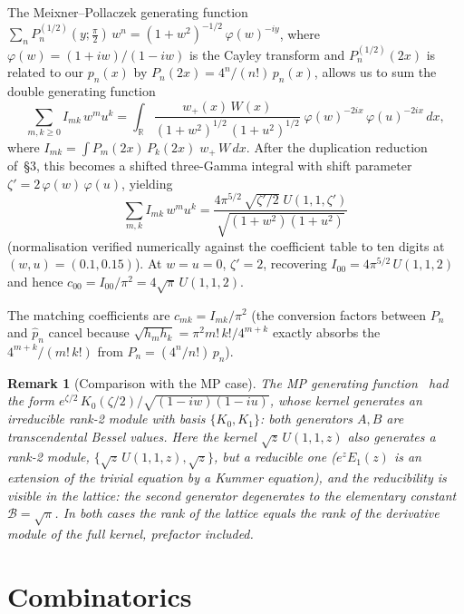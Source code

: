 \documentclass[11pt,a4paper]{article}
\newtheorem{remark}[proposition]{Remark}
\newcommand{\R}{\mathbb{R}}
\begin{document}
The Meixner--Pollaczek generating function
$\sum_n P_n^{(1/2)}(y;\tfrac\pi2)\, w^n
= (1+w^2)^{-1/2}\,\varphi(w)^{-iy}$,
where $\varphi(w) = (1+iw)/(1-iw)$ is the Cayley transform
and $P_n^{(1/2)}(2x)$ is related to our $p_n(x)$ by
$P_n(2x) = 4^n/(n!)\, p_n(x)$,
allows us to sum the double generating function
\[
  \sum_{m,k \ge 0} I_{mk}\, w^m u^k
  = \int_\R \frac{w_+(x)\,W(x)}{(1+w^2)^{1/2}\,(1+u^2)^{1/2}}\;
    \varphi(w)^{-2ix}\,\varphi(u)^{-2ix}\, dx,
\]
where $I_{mk} = \int P_m(2x)\,P_k(2x)\; w_+\,W\, dx$.
After the duplication reduction of~\S3, this becomes a
shifted three-Gamma integral with shift parameter
$\zeta' = 2\,\varphi(w)\,\varphi(u)$,
yielding
\begin{equation}\label{eq:gf}
  \sum_{m,k} I_{mk}\, w^m u^k
  = \frac{4\pi^{5/2}\,\sqrt{\zeta'/2}\; U(1, 1, \zeta')}
         {\sqrt{(1+w^2)(1+u^2)}}
\end{equation}
(normalisation verified numerically against the coefficient table
to ten digits at $(w,u) = (0.1, 0.15)$). At $w = u = 0$,
$\zeta' = 2$, recovering $I_{00} = 4\pi^{5/2}\, U(1,1,2)$ and hence
$c_{00} = I_{00}/\pi^2 = 4\sqrt\pi\, U(1,1,2)$.

The matching coefficients are $c_{mk} = I_{mk}/\pi^2$
(the conversion factors between $P_n$ and $\widehat{p}_n$ cancel
because $\sqrt{h_m h_k} = \pi^2 m!\,k!/4^{m+k}$ exactly absorbs
the $4^{m+k}/(m!\,k!)$ from $P_n = (4^n/n!)\,p_n$).

\begin{remark}[Comparison with the MP case]
The MP generating function~\cite{MP} had the form
$e^{\zeta/2}\,K_0(\zeta/2)/\sqrt{(1-iw)(1-iu)}$, whose kernel
generates an \emph{irreducible} rank-2 module with basis
$\{K_0, K_1\}$: both generators $A, B$ are transcendental Bessel
values. Here the kernel $\sqrt{z}\,U(1,1,z)$ also generates a rank-2
module, $\{\sqrt z\,U(1,1,z), \sqrt z\}$, but a \emph{reducible} one
($e^z E_1(z)$ is an extension of the trivial equation by a Kummer
equation), and the reducibility is visible in the lattice: the
second generator degenerates to the elementary constant
$\mathcal B = \sqrt\pi$. In both cases the rank of the lattice
equals the rank of the derivative module of the full kernel,
prefactor included.
\end{remark}

\section{Combinatorics}
\end{document}
